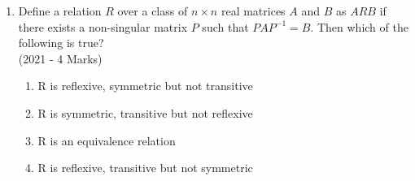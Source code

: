 \documentclass[journal]{IEEEtran}
\begin{document}
\begin{enumerate}
{		}
    \item{
        
            Define a relation $R$ over a class of $n \times n$ real matrices $A$ and $B$ as $A R B$ if  there exists a non-singular matrix $P$ such that $PAP^{-1} = B$. Then which of the following is true?\\ \text{ }
             \hfill
              {(2021 - 4 Marks)}
	              	\begin{enumerate}
	              		\item R is reflexive, symmetric but not transitive
	              		\item R is symmetric, transitive but not reflexive
	              		\item R is an equivalence relation
	              		\item R is reflexive, transitive but not symmetric
	              	\end{enumerate}
        
        }
    \end{enumerate}
\end{document}

